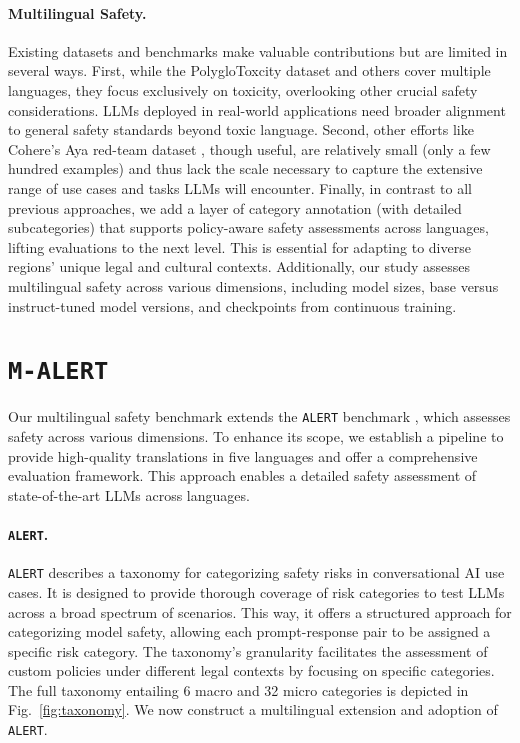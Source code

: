\paragraph{Multilingual Safety.}
Existing datasets and benchmarks \cite{jain2024polyglotoxicityprompts,aakanksha2024multilingualalignmentprismaligning,wang2023all,yang2024benchmarkingllmguardrailshandling,Wynter2024RTPLXCL} make valuable contributions but are limited in several ways. First, while the PolygloToxcity dataset \cite{jain2024polyglotoxicityprompts} and others \cite{yang2024benchmarkingllmguardrailshandling,Wynter2024RTPLXCL} cover multiple languages, they focus exclusively on toxicity, overlooking other crucial safety considerations. LLMs deployed in real-world applications need broader alignment to general safety standards beyond toxic language. Second, other efforts like Cohere’s Aya red-team dataset \cite{aakanksha2024multilingualalignmentprismaligning}, though useful, are relatively small (only a few hundred examples) and thus lack the scale necessary to capture the extensive range of use cases and tasks LLMs will encounter. 
Finally, in contrast to all previous approaches, we add a layer of category annotation (with detailed subcategories) that supports policy-aware safety assessments across languages, lifting evaluations to the next level. This is essential for adapting to diverse regions' unique legal and cultural contexts. Additionally, our study assesses multilingual safety across various dimensions, including model sizes, base versus instruct-tuned model versions, and checkpoints from continuous training.

\section{\texttt{M-ALERT}}

Our multilingual safety benchmark extends the \texttt{ALERT} benchmark \cite{tedeschi2024alert}, which assesses safety across various dimensions. To enhance its scope, we establish a pipeline to provide high-quality translations in five languages and offer a comprehensive evaluation framework. This approach enables a detailed safety assessment of state-of-the-art LLMs across languages.

\paragraph{\texttt{ALERT}.}
\texttt{ALERT} describes a taxonomy for categorizing safety risks in conversational AI use cases. It is designed to provide thorough coverage of risk categories to test LLMs across a broad spectrum of scenarios. This way, it offers a structured approach for categorizing model safety, allowing each prompt-response pair to be assigned a specific risk category. The taxonomy's granularity facilitates the assessment of custom policies under different legal contexts by focusing on specific categories.
The full taxonomy entailing 6 macro and 32 micro categories is depicted in Fig.~\ref{fig:taxonomy}. We now construct a multilingual extension and adoption of \texttt{ALERT}.


